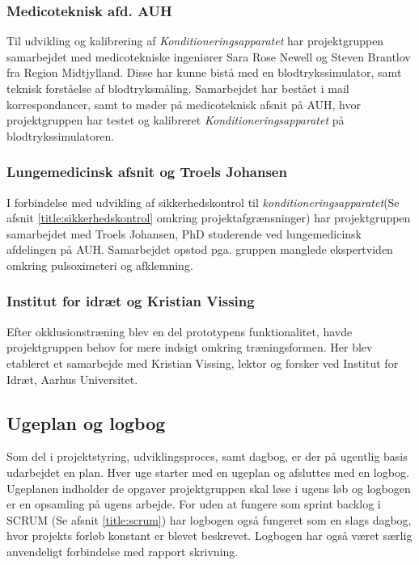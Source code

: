 \subsubsection{Medicoteknisk afd. AUH}
Til udvikling og kalibrering af \textit{Konditioneringsapparatet} har projektgruppen samarbejdet med medicotekniske ingeniører  Sara Rose Newell og Steven Brantlov fra Region Midtjylland. Disse har kunne bistå med en blodtrykssimulator, samt teknisk forståelse af blodtryksmåling. Samarbejdet har bestået i mail korrespondancer, samt to møder på medicoteknisk afsnit på AUH, hvor projektgruppen har testet og kalibreret \textit{Konditioneringsapparatet} på blodtrykssimulatoren. 

\subsubsection{Lungemedicinsk afsnit og Troels Johansen}
I forbindelse med udvikling af sikkerhedskontrol til \textit{konditioneringsapparatet}(Se afsnit \ref{title:sikkerhedskontrol} omkring projektafgrænsninger) har projektgruppen samarbejdet med Troels Johansen, PhD studerende ved lungemedicinsk afdelingen på AUH. Samarbejdet opstod pga. gruppen manglede ekspertviden omkring pulsoximeteri og afklemning.

\subsubsection{Institut for idræt og Kristian Vissing} 
Efter okklusionstræning blev en del prototypens funktionalitet, havde projektgruppen behov for mere indsigt omkring træningsformen. Her blev etableret et samarbejde med Kristian Vissing, lektor og forsker ved Institut for Idræt, Aarhus Universitet.  

\subsection{Ugeplan og logbog}
Som del i projektstyring, udviklingsproces, samt dagbog, er der på ugentlig basis udarbejdet en plan. Hver uge starter med en ugeplan og afsluttes med en logbog. Ugeplanen indholder de opgaver projektgruppen skal løse i ugens løb og logbogen er en opsamling på ugens arbejde. For uden at fungere som sprint backlog i SCRUM (Se afsnit \ref{title:scrum}) har logbogen også fungeret som en slags dagbog, hvor projekts forløb konstant er blevet beskrevet. Logbogen har også været særlig anvendeligt forbindelse med rapport skrivning. 

